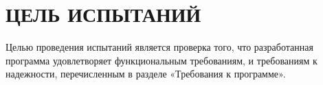\section{\uppercase{Цель испытаний}}

Целью проведения испытаний является проверка того, что разработанная программа
удовлетворяет функциональным требованиям, и требованиям к надежности, перечисленным в
разделе «Требования к программе».

\clearpage